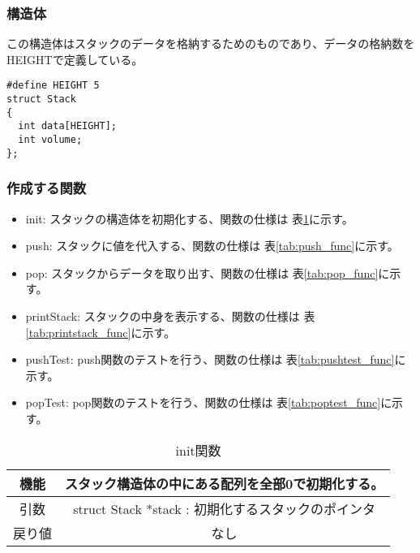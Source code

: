 \documentclass[a4paper,11pt]{jsarticle}
\begin{document}
\subsubsection{構造体}
この構造体はスタックのデータを格納するためのものであり、データの格納数をHEIGHTで定義している。
\begin{lstlisting}[caption={stack.h}, label={lst:stackh}]
#define HEIGHT 5
struct Stack
{
  int data[HEIGHT];
  int volume;
};
\end{lstlisting}
\subsubsection{作成する関数}
\begin{itemize}
  \item init: スタックの構造体を初期化する、関数の仕様は 表\ref{tab:init_func}に示す。
  \item push: スタックに値を代入する、関数の仕様は 表\ref{tab:push_func}に示す。
  \item pop: スタックからデータを取り出す、関数の仕様は 表\ref{tab:pop_func}に示す。
  \item printStack: スタックの中身を表示する、関数の仕様は 表\ref{tab:printstack_func}に示す。
  \item pushTest: push関数のテストを行う、関数の仕様は 表\ref{tab:pushtest_func}に示す。
  \item popTest: pop関数のテストを行う、関数の仕様は 表\ref{tab:poptest_func}に示す。
\end{itemize}

\begin{table}[ht]
  \centering
  \begin{tabular}{|c|c|}
    \hline
    機能  & スタック構造体の中にある配列を全部0で初期化する。            \\
    \hline
    引数  & struct Stack *stack : 初期化するスタックのポインタ \\
    \hline
    戻り値 & なし                                   \\
    \hline
  \end{tabular}
  \caption{init関数}
  \label{tab:init_func}
\end{table}
\end{document}
